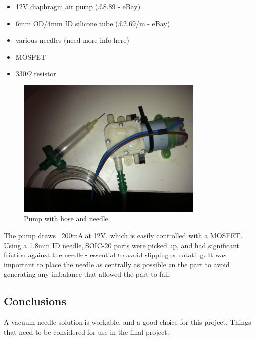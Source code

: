 \begin{itemize} \itemsep0em
	\item	12V diaphragm air pump (\pounds 8.89 - eBay)
	\item	6mm OD/4mm ID silicone tube (\pounds 2.69/m - eBay)
	\item	various needles (need more info here)
	\item	MOSFET
	\item	330$\Omega$ resistor
\end{itemize}

\begin{figure}[ht!]
\centering
\includegraphics[width=90mm]{resources/pump_and_hose.jpg}
\caption{Pump with hose and needle.}
\label{hose and needle}
\end{figure}

The pump draws ~200mA at 12V, which is easily controlled with a MOSFET. Using a 1.8mm ID needle, SOIC-20 parts were picked up, 
and had significant friction against the needle - essential to avoid slipping or rotating. It was important to place the needle 
as centrally as possible on the part to avoid generating any imbalance that allowed the part to fall. 

\subsection{Conclusions}
A vacuum needle solution is workable, and a good choice for this project. Things that need to be considered for use in the final project:

